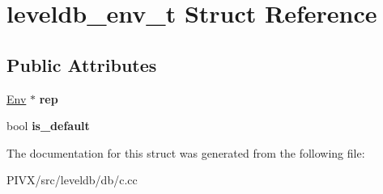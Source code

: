 \hypertarget{structleveldb__env__t}{}\section{leveldb\+\_\+env\+\_\+t Struct Reference}
\label{structleveldb__env__t}
\subsection*{Public Attributes}
\begin{DoxyCompactItemize}
\item 
\mbox{\label{structleveldb__env__t_ad41038b41aebaf7ffba1a4bbfaa8b539}} 
\mbox{\hyperlink{classleveldb_1_1_env}{Env}} $\ast$ {\bfseries rep}
\item 
\mbox{\label{structleveldb__env__t_a53e285385a628e932128aec1f0fe1dae}} 
bool {\bfseries is\+\_\+default}
\end{DoxyCompactItemize}


The documentation for this struct was generated from the following file\+:\begin{DoxyCompactItemize}
\item 
P\+I\+V\+X/src/leveldb/db/c.\+cc\end{DoxyCompactItemize}
